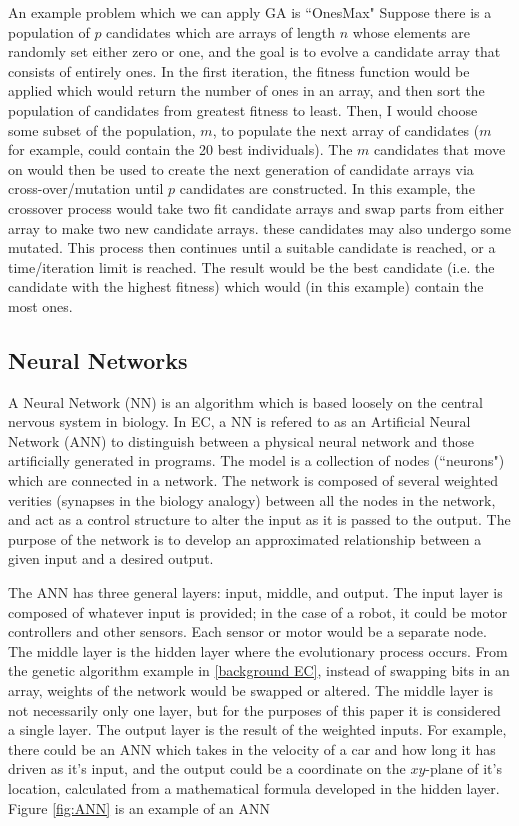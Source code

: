 \documentclass{sig-alternate}
\begin{document}
  An example problem which we can apply GA is ``OnesMax" Suppose there is a population of $p$ candidates which are arrays of length $n$ whose elements are randomly set either zero or one, and the goal is to evolve a candidate array that consists of entirely ones. In the first iteration, the fitness function would be applied which would return the number of ones in an array, and then sort the population of candidates from greatest fitness to least. Then, I would choose some subset of the population, $m$, to populate the next array of candidates ($m$ for example, could contain the 20 best individuals). The $m$ candidates that move on would then be used to create the next generation of candidate arrays via cross-over/mutation until $p$ candidates are constructed. In this example, the crossover process would take two fit candidate arrays and swap parts from either array to make two new candidate arrays. these candidates may also undergo some mutated. This process then continues until a suitable candidate is reached, or a time/iteration limit is reached. The result would be the best candidate (i.e. the candidate with the highest fitness) which would (in this example) contain the most ones.
  
\subsection{Neural Networks}
	A Neural Network (NN) \cite{wiki:robotics} is an algorithm which is based loosely on the central nervous system in biology. In EC, a NN is refered to as an Artificial Neural Network (ANN) to distinguish between a physical neural network and those artificially generated in programs. The model is a collection of nodes (``neurons") which are connected in a network. The network is composed of several weighted verities (synapses in the biology analogy) between all the nodes in the network, and act as a control structure to alter the input as it is passed to the output. The purpose of the network is to develop an approximated relationship between a given input and a desired output.

	 The ANN has three general layers: input, middle, and output. The input layer is composed of whatever input is provided; in the case of a robot, it could be motor controllers and other sensors. Each sensor or motor would be a separate node. The middle layer is the hidden layer where the evolutionary process occurs. From the genetic algorithm example in \ref{background EC}, instead of swapping bits in an array, weights of the network would be swapped or altered. The middle layer is not necessarily only one layer, but for the purposes of this paper it is considered a single layer. The output layer is the result of the weighted inputs. For example, there could be an ANN which takes in the velocity of a car and how long it has driven as it's input, and the output could be a coordinate on the $xy$-plane of it's location, calculated from a mathematical formula developed in the hidden layer. Figure \ref{fig:ANN} is an example of an ANN
  
\end{document}
